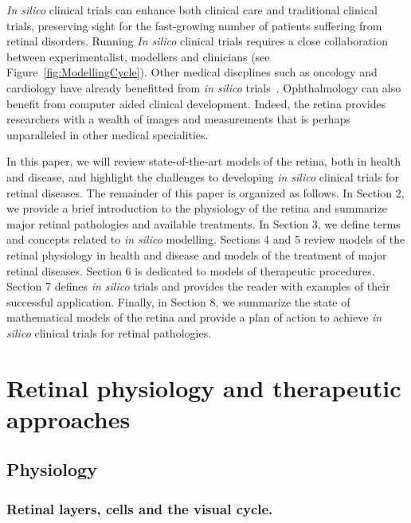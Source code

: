 \documentclass{article}
\begin{document}
\textit{In silico} clinical trials can enhance both clinical care and traditional clinical trials, preserving sight for the fast-growing number of patients suffering from retinal disorders.
Running \textit{In silico} clinical trials requires a close collaboration between experimentalist, modellers and clinicians (see Figure~\ref{fig:ModellingCycle}).
Other medical discplines such as oncology and cardiology have already benefitted from \textit{in silico} trials~\cite{Gaffney2022,Ravvaz2017}.
Ophthalmology can also benefit from computer aided clinical development.
Indeed, the retina provides researchers with a wealth of images and measurements that is perhaps unparalleled in other medical specialities.

In this paper, we will review state-of-the-art models of the retina, both in health and disease, and highlight the challenges to developing \textit{in silico} clinical trials for retinal diseases.
The remainder of this paper is organized as follows.
In Section 2, we provide a brief introduction to the physiology of the retina and summarize major retinal pathologies and available treatments.
In Section 3, we define terms and concepts related to \textit{in silico} modelling.
Sections 4 and 5 review models of the retinal physiology in health and disease and models of the treatment of major retinal diseases.
Section 6 is dedicated to models of therapeutic procedures.
Section 7 defines \textit{in silico} trials and provides the reader with examples of their successful application.
Finally, in Section 8, we summarize the state of mathematical models of the retina and provide a plan of action to achieve \textit{in silico} clinical trials for retinal pathologies.

\section{Retinal physiology and therapeutic approaches}\label{sec:RetinalPhysiology}

\subsection{Physiology}


\subsubsection{Retinal layers, cells and the visual cycle.}
\end{document}
